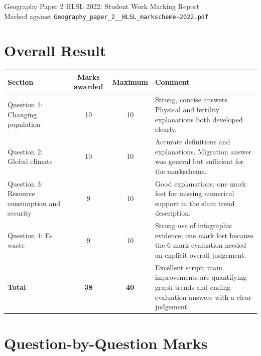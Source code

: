 \documentclass[11pt]{article}
\begin{document}
\begin{center}
  {\Large Geography Paper 2 HLSL 2022: Student Work Marking Report}\\[4pt]
  {\normalsize Marked against \texttt{Geography\_paper\_2\_\_HLSL\_markscheme-2022.pdf}}
\end{center}

\section*{Overall Result}

\begin{tabularx}{\textwidth}{@{}l c c Y@{}}
\toprule
Section & Marks awarded & Maximum & Comment \\
\midrule
Question 1: Changing population & 10 & 10 & Strong, concise answers. Physical and fertility explanations both developed clearly. \\
Question 2: Global climate & 10 & 10 & Accurate definitions and explanations. Migration answer was general but sufficient for the markscheme. \\
Question 3: Resource consumption and security & 9 & 10 & Good explanations; one mark lost for missing numerical support in the slum trend description. \\
Question 4: E-waste & 9 & 10 & Strong use of infographic evidence; one mark lost because the 6-mark evaluation needed an explicit overall judgement. \\
\midrule
\textbf{Total} & \textbf{38} & \textbf{40} & Excellent script; main improvements are quantifying graph trends and ending evaluation answers with a clear judgement. \\
\bottomrule
\end{tabularx}

\section*{Question-by-Question Marks}
\end{document}

